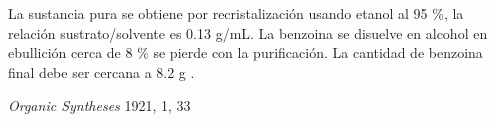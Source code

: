 \documentclass[11pt, letterpage]{article}
\begin{document}
La sustancia pura se obtiene por recristalizaci\'on usando etanol al 95 \%, la relaci\'on sustrato/solvente es 0.13 g/mL. La benzoina se disuelve en alcohol en ebullici\'on cerca de 8 \% se pierde con la purificaci\'on. La cantidad de benzoina final debe ser cercana a 8.2 g \cite{Benzoin}.


\begin{thebibliography}{9}
	\textit{Organic Syntheses} 1921, 1, 33
\end{thebibliography}
\end{document}
